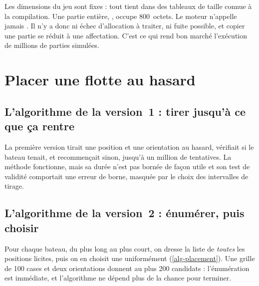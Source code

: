 Les dimensions du jeu sont fixes : tout tient dans des tableaux de taille connue à la
compilation. Une partie entière, , occupe 800~octets. Le moteur n'appelle
jamais . Il n'y a donc ni échec d'allocation à traiter, ni fuite possible, et
copier une partie se réduit à une affectation. C'est ce qui rend bon marché l'exécution de
millions de parties simulées.

\section{Placer une flotte au hasard}

\subsection{L'algorithme de la version~1 : tirer jusqu'à ce que ça rentre}

La première version tirait une position et une orientation au hasard, vérifiait si le
bateau tenait, et recommençait sinon, jusqu'à un million de tentatives. La méthode
fonctionne, mais sa durée n'est pas bornée de façon utile et son test de validité comportait
une erreur de borne, masquée par le choix des intervalles de tirage.

\subsection{L'algorithme de la version~2 : énumérer, puis choisir}

Pour chaque bateau, du plus long au plus court, on dresse la liste de \emph{toutes} les
positions licites, puis on en choisit une uniformément (\cref{alg-placement}). Une grille
de 100 cases et deux orientations donnent au plus 200 candidats : l'énumération est
immédiate, et l'algorithme ne dépend plus de la chance pour terminer.

\begin{algorithm}[ht]
    \caption{Placement aléatoire d'une flotte}
    \label{alg-placement}
\end{algorithm}

